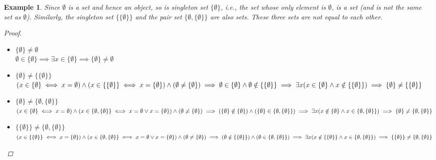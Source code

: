 \documentclass[a4paper,oneside]{book}
\newtheorem*{proof}{\textit{Proof.}}
\newtheorem{example}{Example}[section]
\begin{document}
			\begin{example}
				Since $\emptyset$ is a set and hence an object, so is singleton set $\{\emptyset\}$, \textit{i.e.,} the set whose only element is $\emptyset$, is a set (and is not the same set as $\emptyset$). Similarly, the singleton set $\{\{\emptyset\}\}$ and the pair set $\{\emptyset,\{\emptyset\}\}$ are also sets. These three sets are not equal to each other.
				\begin{proof}~
					\begin{itemize}
						\item $\{\emptyset\}\neq\emptyset$\\
						$\emptyset\in\{\emptyset\}\implies\exists x\in\{\emptyset\}\implies\{\emptyset\}\neq\emptyset$
						\item $\{\emptyset\}\neq\{\{\emptyset\}\}$\\
						$(x\in\{\emptyset\}\iff x=\emptyset)\land(x\in\{\{\emptyset\}\}\iff x=\{\emptyset\})\land(\emptyset\neq\{\emptyset\})\\\implies \emptyset\in\{\emptyset\}\land \emptyset\notin\{\{\emptyset\}\}\\\implies\exists x(x\in\{\emptyset\}\land x\notin\{\{\emptyset\}\})\\\implies\{\emptyset\}\neq\{\{\emptyset\}\}$
						\item $\{\emptyset\}\neq\{\emptyset,\{\emptyset\}\}$\\
						$(x\in\{\emptyset\}\iff x=\emptyset)\land(x\in\{\emptyset,\{\emptyset\}\}\iff x=\emptyset\lor x=\{\emptyset\})\land(\emptyset\neq\{\emptyset\})\\\implies (\{\emptyset\}\notin\{\emptyset\})\land(\{\emptyset\}\in\{\emptyset,\{\emptyset\}\})\\\implies\exists x(x\notin\{\emptyset\}\land x\in\{\emptyset,\{\emptyset\}\})\\\implies\{\emptyset\}\neq\{\emptyset,\{\emptyset\}\}$
						\item $\{\{\emptyset\}\}\neq\{\emptyset,\{\emptyset\}\}$\\
						$(x\in\{\{\emptyset\}\}\iff x=\{\emptyset\})\land(x\in\{\emptyset,\{\emptyset\}\}\iff x=\emptyset\lor x=\{\emptyset\})\land(\emptyset\neq\{\emptyset\})\\\implies (\emptyset\notin\{\{\emptyset\}\})\land(\emptyset\in\{\emptyset,\{\emptyset\}\})\\\implies\exists x(x\notin\{\{\emptyset\}\}\land x\in\{\emptyset,\{\emptyset\}\})\\\implies\{\{\emptyset\}\}\neq\{\emptyset,\{\emptyset\}\}$
					\end{itemize}
				\end{proof}
			\end{example}
\end{document}
